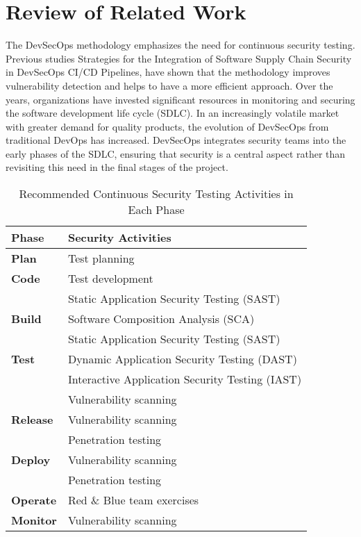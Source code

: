 \documentclass[conference]{IEEEtran}
\begin{document}
\section{Review of Related Work}
The DevSecOps methodology emphasizes the need for continuous security testing. Previous studies \cite{Chandramouli2024} Strategies for the Integration of Software Supply Chain Security in DevSecOps CI/CD Pipelines, have shown that the methodology improves vulnerability detection and helps to have a more efficient approach. Over the years, organizations have invested significant resources in monitoring and securing the software development life cycle (SDLC). 
In an increasingly volatile market with greater demand for quality products, the evolution of DevSecOps from traditional DevOps has increased. DevSecOps integrates security teams into the early phases of the SDLC, ensuring that security is a central aspect rather than revisiting this need in the final stages of the project.

\begin{table}[h]
    \centering
    \caption{Recommended Continuous Security Testing Activities in Each Phase}
    \renewcommand{\arraystretch}{1.3}
    \begin{tabular}{|l|l|}
        \hline
        \textbf{Phase} & \textbf{Security Activities} \\ \hline
        \textbf{Plan} & Test planning \\ \hline
        \textbf{Code} & Test development \\ 
                     & Static Application Security Testing (SAST) \\ \hline
        \textbf{Build} & Software Composition Analysis (SCA) \\ 
                      & Static Application Security Testing (SAST) \\ \hline
        \textbf{Test} & Dynamic Application Security Testing (DAST) \\ 
                     & Interactive Application Security Testing (IAST) \\ 
                     & Vulnerability scanning \\ \hline
        \textbf{Release} & Vulnerability scanning \\ 
                        & Penetration testing \\ \hline
        \textbf{Deploy} & Vulnerability scanning \\ 
                        & Penetration testing \\ \hline
        \textbf{Operate} & Red \& Blue team exercises \\ \hline
        \textbf{Monitor} & Vulnerability scanning \\ \hline
    \end{tabular}
    \label{tab:security_testing}
\end{table}
\end{document}
